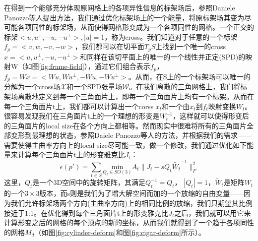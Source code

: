 在得到一个能够充分体现原网格上的各项异性信息的标架场后，参照Daniele Panozzo等人提出方法\cite{frame-field-warping}，我们通过优化标架场上的一个能量，将原标架场其变为尽可能各项同性的标架场，从而使得网格形变成为一个各项同性的网格。一个正交的标架$< u, u^\bot , −u, −u^\bot >, |u| = 1$，称为cross。我们知道对于任意的一个标架$f_p = <v, w, −v, −w >$，我们都可以在切平面$T_p S$上找到一个唯一的cross $x =<u, u^\bot , −u, −u^\bot >$和同样在该切平面上的唯一的一个线性并正定(SPD)的映射W（如图\ref{fig:frame-field}），通过它们组合表示$f_p$，$f_p = Wx = <Wu, Wu^\bot, -Wu, -Wu^\bot>$。从而，在S上的一个标架场可以唯一的分解为一个cross场$\mathcal{X}$和一个SPD张量场$\mathcal{W}$。在我们离散的三角网格上，我们将标架场离散地定义到每一个三角面片上，即每一个三角面片上均有一个标架。从而在每一个三角面片t上，我们都可以计算出一个corss $x_t$和一个由$x_t$到$f_t$映射变换$W_t$。很容易发现我们在三角面片t上的一个理想的形变是$W_t^{−1}$，这样就可以使得形变后的三角面片的local size在各个方向上都相等。然而现实中很难将所有的三角面片全部变形到最理想的状态，参照Daiele Panozzo等人的方法\cite{frame-field-warping}，并根据我们的需求——需要使得主曲率方向上的local size尽可能一致，做一个修改，我们通过优化如下能量来计算每个三角面片t上的形变雅克比$J_t$：
\begin{equation}
  \epsilon(p') = \sum_{t\in S} \underset{Q_t \in SO(3)}{\text{min}} A_t \lVert J_t - sQ_t \widetilde{W_t}^{-1} \rVert_F^2
\end{equation}
这里，$Q_t$是一个3D空间中的旋转矩阵，其满足$Q_t^{-1} = Q_t$， $|Q_t| = 1$，$\widetilde{W}_t$是矩阵$W_t$的一个$3 \times 3$版本，而s则是我们为了增大解空间而加的一个放缩的自由变量——因为我们允许标架场两个方向(主曲率方向)上的相同比例的放缩，我们只期望其比例接近于1:1。在优化得到每个三角面片t上的形变雅克比$J_t$之后，我们就可以用它来计算形变之后的网格的每个顶点的新的坐标，从而我们就得到了一个趋于各项同性的网格$M_d$（如图\ref{fig:cylinder-deform}和图\ref{fig:cigar-deform}所示）。

